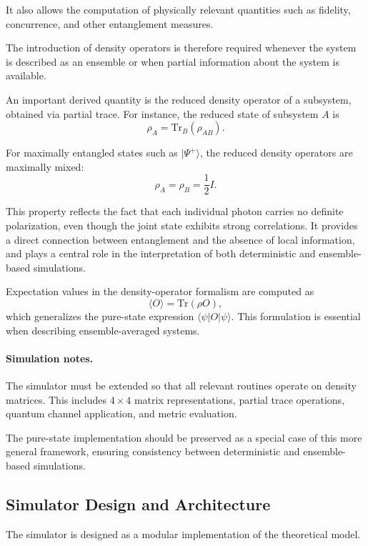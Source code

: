 \documentclass[a4paper]{article}
\begin{document}
It also allows the computation of physically relevant quantities such as fidelity, concurrence, and other entanglement measures.

The introduction of density operators is therefore required whenever the system is described as an ensemble or when partial information about the system is available.

An important derived quantity is the reduced density operator of a subsystem, obtained via partial trace. For instance, the reduced state of subsystem \(A\) is
\[
\rho_A = \mathrm{Tr}_B(\rho_{AB}).
\]

For maximally entangled states such as \( |\Psi^+\rangle \), the reduced density operators are maximally mixed:
\[
\rho_A = \rho_B = \frac{1}{2} I.
\]

This property reflects the fact that each individual photon carries no definite polarization, even though the joint state exhibits strong correlations. It provides a direct connection between entanglement and the absence of local information, and plays a central role in the interpretation of both deterministic and ensemble-based simulations.

Expectation values in the density-operator formalism are computed as
\[
\langle O \rangle = \mathrm{Tr}(\rho O),
\]
which generalizes the pure-state expression \( \langle \psi | O | \psi \rangle \). This formulation is essential when describing ensemble-averaged systems.

\paragraph{Simulation notes.}
The simulator must be extended so that all relevant routines operate on density matrices. This includes \(4 \times 4\) matrix representations, partial trace operations, quantum channel application, and metric evaluation.

The pure-state implementation should be preserved as a special case of this more general framework, ensuring consistency between deterministic and ensemble-based simulations.


\subsection{Simulator Design and Architecture}

The simulator is designed as a modular implementation of the theoretical model.
\end{document}
